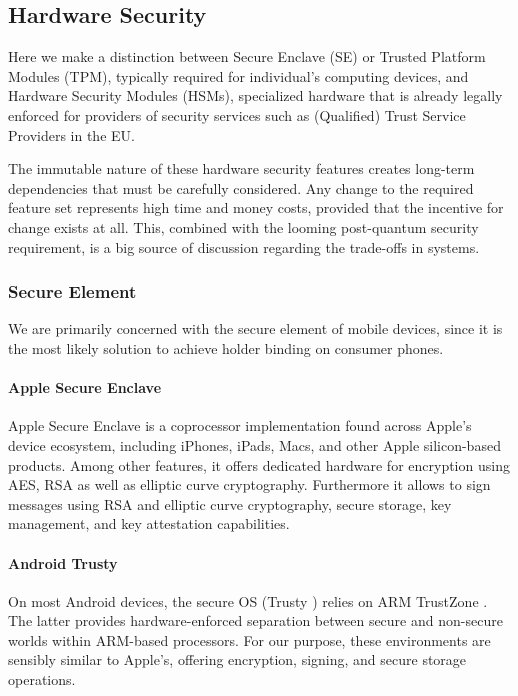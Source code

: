 
\subsection{Hardware Security}

Here we make a distinction between Secure Enclave (SE) or Trusted Platform Modules (TPM), typically required for individual's computing devices, and Hardware Security Modules (HSMs), specialized hardware that is already legally enforced for providers of security services such as (Qualified) Trust Service Providers in the EU.

The immutable nature of these hardware security features creates long-term dependencies that must be carefully considered. Any change to the required feature set represents high time and money costs, provided that the incentive for change exists at all. This, combined with the looming post-quantum security requirement, is a big source of discussion regarding the trade-offs in \eid systems.


\subsubsection{Secure Element} We are primarily concerned with the secure element of mobile devices, since it is the most likely solution to achieve holder binding on consumer phones.

\paragraph{Apple Secure Enclave}

Apple Secure Enclave \cite{apple-secure-enclaves} is a coprocessor implementation found across Apple's device ecosystem, including iPhones, iPads, Macs, and other Apple silicon-based products. Among other features, it offers dedicated hardware for encryption using AES, RSA as well as elliptic curve cryptography.
Furthermore it allows to sign messages using RSA and elliptic curve cryptography, secure storage, key management, and key attestation capabilities.

\paragraph{Android Trusty}

On most Android devices, the secure OS (Trusty \cite{trusty}) relies on ARM TrustZone \cite{arm-trustzone}. The latter provides hardware-enforced separation between secure and non-secure worlds within ARM-based processors.
For our purpose, these environments are sensibly similar to Apple's, offering encryption, signing, and secure storage operations.


